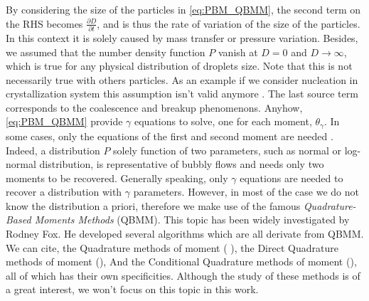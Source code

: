 By considering the size of the particles in \ref{eq:PBM_QBMM}, the second term on the RHS becomes $\frac{\partial D}{\partial t}$, and is thus the rate of variation of the size of the particles.
In this context it is solely caused by mass transfer or pressure variation. 
Besides, we assumed that the number density function $P$ vanish at $D=0$ and $D\rightarrow\infty$, which is true for any physical distribution of droplets size.
Note that this is not necessarily true with others particles.
As an example if we consider nucleation in crystallization system this assumption isn't valid anymore \citep{randolph2012theory}. 
The last source term corresponds to the coalescence and breakup phenomenons. 
Anyhow, \ref{eq:PBM_QBMM} provide $\gamma$ equations to solve, one for each moment, $\theta_\gamma$.
In some cases, only the equations of the first and second moment are needed \citet{KAMP20011363}.
Indeed, a distribution $P$ solely function of two parameters, such as normal or log-normal distribution, is representative of bubbly flows \citep*{KAMP20011363,zaepffel2011modelisation} and needs only two moments to be recovered. 
Generally speaking, only $\gamma$ equations are needed to recover a distribution with $\gamma$ parameters. 
However, in most of the case we do not know the distribution a priori, therefore we make use of the famous \textit{Quadrature-Based Moments Methods} (QBMM).
This topic has been widely investigated by Rodney Fox.
He developed several algorithms which are all derivate from QBMM. 
We can cite, the Quadrature  methods of moment (\citet{marchisio2013computational} \citet{morel2015mathematical}\citet{marchisio2003quadrature}), the Direct Quadrature methods of moment (\citet{marchisio2005solution}), And the Conditional Quadrature methods of moment (\citet{yuan2011conditional}), all of which has their own specificities.  
Although the study of these methods is of a great interest, we won't focus on this topic in this work.

